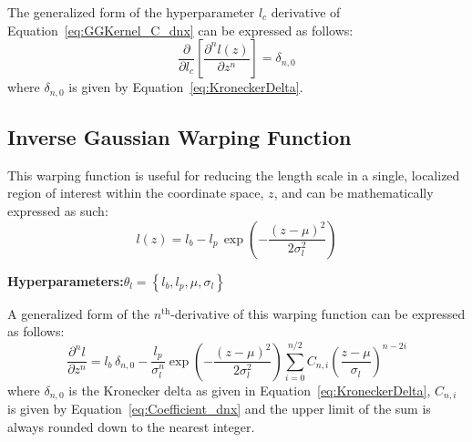 \documentclass{article}
\begin{document}
The generalized form of the hyperparameter $l_c$ derivative of Equation~\eqref{eq:GGKernel_C_dnx} can be expressed as follows:
\begin{equation}
\label{eq:GGKernel_C_db_dnx}
	\frac{\partial}{\partial l_c} \left[\frac{\partial^n l\!\left(z\right)}{\partial z^n}\right] = \delta_{n,0}
\end{equation}
where $\delta_{n,0}$ is given by Equation~\eqref{eq:KroneckerDelta}.

\subsection{Inverse Gaussian Warping Function}
\label{subsec:GGKernel_IG}

This warping function is useful for reducing the length scale in a single, localized region of interest within the coordinate space, $z$, and can be mathematically expressed as such:
\begin{equation}
\label{eq:GGKernel_IG}
	l\!\left(z\right) = l_b - l_p \, \exp{\left(-\frac{\left(z - \mu\right)^2}{2 \sigma_l^2}\right)}
\end{equation}

\begin{center}
	\textbf{Hyperparameters:}\hspace{20pt}$\theta_l = \left\lbrace l_b,l_p,\mu,\sigma_l \right\rbrace$
\end{center}

\begin{comment}
\begin{equation}
\label{eq:GGKernel_IG_d1z}
	\frac{\partial l\!\left(z\right)}{\partial z} = l_p \frac{z - \mu}{\sigma_l^2} \exp{\left(-\frac{\left(z - \mu\right)^2}{2 \sigma_l^2}\right)}
\end{equation}
\end{comment}

A generalized form of the $n^{\text{th}}$-derivative of this warping function can be expressed as follows:
\begin{equation}
\label{eq:GGKernel_IG_dnx}
	\frac{\partial^n l}{\partial z^n} = l_b \, \delta_{n,0} - \frac{l_p}{\sigma_l^n} \exp{\left(-\frac{\left(z - \mu\right)^2}{2 \sigma_l^2}\right)} \sum_{i=0}^{n/2} C_{n,i} \left(\frac{z - \mu}{\sigma_l}\right)^{n-2i}
\end{equation}
where $\delta_{n,0}$ is the Kronecker delta as given in Equation~\eqref{eq:KroneckerDelta}, $C_{n,i}$ is given by Equation~\eqref{eq:Coefficient_dnx} and the upper limit of the sum is always rounded down to the nearest integer.
\end{document}
